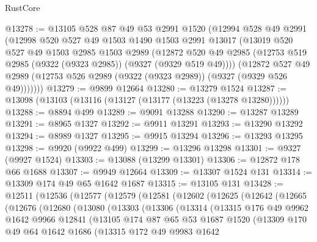 \begin{lexlean}{RustCore}
\begin{coremodule}
@13278 := @13105
    @528
    @87
    @49
    @53
    @2991
    @1520
    (@12994
      @528
      @49
      @2991
      (@12998
        @520
        @527
        @49
        @1503
        @1490
        @1503
        @2991
        @13017
        (@13019
          @520
          @527
          @49
          @1503
          @2985
          @1503
          @2989
          (@12872 @520 @49 @2985 (@12753 @519 @2985 (@9322 (@9323 @2985)) (@9327 (@9329 @519 @49))))
          (@12872
            @527
            @49
            @2989
            (@12753 @526 @2989 (@9322 (@9323 @2989)) (@9327 (@9329 @526 @49)))))))
@13279 := @9899 @12664
@13280 := @13279 @1524
@13287 := @13098 (@13103 (@13116 (@13127 (@13177 (@13223 (@13278 @13280))))))
@13288 := @8894 @499
@13289 := @9091 @13288
@13290 := @13287 @13289
@13291 := @8965 @1327
@13292 := @9911 @13291
@13293 := @13290 @13292
@13294 := @8989 @1327
@13295 := @9915 @13294
@13296 := @13293 @13295
@13298 := @9920 (@9922 @499)
@13299 := @13296 @13298
@13301 := @9327 (@9927 @1524)
@13303 := @13088 (@13299 @13301)
@13306 := @12872 @178 @66 @1688
@13307 := @9949 @12664
@13309 := @13307 @1524 @131
@13314 := @13309 @174 @49 @65 @1642 @1687
@13315 := @13105 @131
@13428 := @12511
    (@12536
      (@12577
        (@12579
          (@12581
            (@12602
              (@12625
                (@12642
                  (@12665
                    (@12676
                      (@12680
                        (@13080
                          (@13303
                            (@13306
                              (@13314
                                (@13315
                                  @176
                                  @49
                                  @9962
                                  @1642
                                  @9966
                                  @12841
                                  (@13105
                                    @174
                                    @87
                                    @65
                                    @53
                                    @1687
                                    @1520
                                    (@13309
                                      @170
                                      @49
                                      @64
                                      @1642
                                      @1686
                                      (@13315
                                        @172
                                        @49
                                        @9983
                                        @1642

\end{coremodule}
\end{lexlean}
